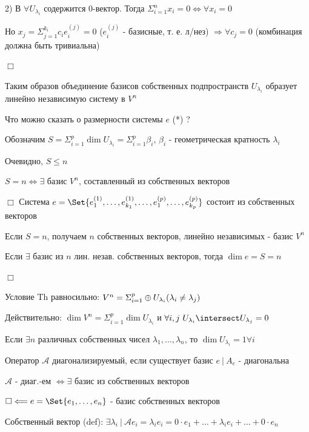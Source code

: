 \documentclass[12pt]{article}
\begin{document}
    2) В $\forall U_{\lambda_i}$ содержится $0$-вектор. Тогда $\Sigma_{i=1}^n x_i = 0 \Longleftrightarrow \forall x_i = 0$

    Но $x_j = \Sigma_{j=1}^{k_i} c_i e^{(j)}_i = 0$ ($e^{(j)}_i$ - базисные, т. е. л/нез) $\Longrightarrow \forall c_j = 0$ (комбинация должна быть тривиальна)

    $\Box$

    \Nota Таким образов объединение базисов собственных подпространств $U_{\lambda_i}$ образует линейно независимую систему в $V^n$

    Что можно сказать о размерности системы $e$ (*) ?

    Обозначим $S = \Sigma_{i=1}^p \dim U_{\lambda_i} = \Sigma_{i=1}^p \beta_i$, $\beta_i$ - геометрическая кратность $\lambda_i$

    Очевидно, $S \leq n$

    \Th $S = n \Longleftrightarrow \exists$ базис $V^n$, составленный из собственных векторов

    $\Box$ Система $e = \Set{e^{(1)}_1, \dots, e^{(1)}_{k_1}, \dots, e^{(p)}_1, \dots, e^{(p)}_{k_p}}$ состоит из собственных векторов

    Если $S = n$, получаем $n$ собственных векторов, линейно независимых - базис $V^n$

    Если $\exists$ базис из $n$ лин. незав. собственных векторов, тогда $\dim e = S = n$

    $\Box$

    \Nota Условие Th равносильно: $V^n = \Sigma_{i=1}^p \oplus U_{\lambda_i} (\lambda_i \neq \lambda_j)$

    Действительно: $\dim V^n = \Sigma_{i=1}^p \dim U_{\lambda_i}$ и $\forall i, j \ U_{\lambda_i} \intersect U_{\lambda_j} = 0$

    \Ex Если $\exists n$ различных собственных чисел $\lambda_1, \dots, \lambda_n$, то $\dim U_{\lambda_i} = 1 \forall i$

    \Def Оператор $\mathcal{A}$ диагонализируемый, если существует базис $e \ | \ A_e$ - диагональна

    \Th $\mathcal{A}$ - диаг.-ем $\Longleftrightarrow \exists$ базис из собственных векторов

    $\Box \Longleftarrow e = \Set{e_1, \dots, e_n}$ - базис собственных векторов

    Собственный вектор (def): $\exists \lambda_i \ | \ \mathcal{A}e_i = \lambda_i e_i = 0 \cdot e_1 + \dots + \lambda_i e_i + \dots + 0 \cdot e_n$
\end{document}
